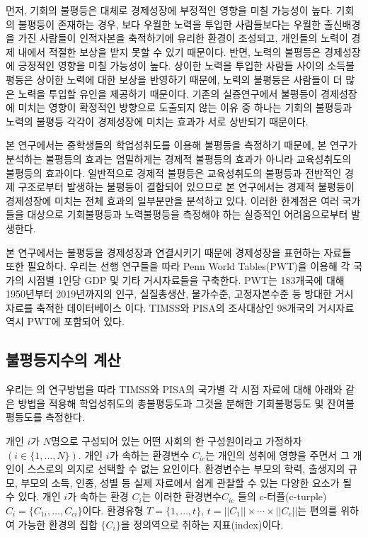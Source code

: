 먼저, 기회의 불평등은 대체로 경제성장에 부정적인 영향을 미칠 가능성이 높다.
기회의 불평등이 존재하는 경우, 보다 우월한 노력을 투입한 사람들보다는 우월한 출신배경을 가진 사람들이 인적자본을 축적하기에 유리한 환경이 조성되고, 개인들의 노력이 경제 내에서 적절한 보상을 받지 못할 수 있기 때문이다.
반면, 노력의 불평등은 경제성장에 긍정적인 영향을 미칠 가능성이 높다.
상이한 노력을 투입한 사람들 사이의 소득불평등은 상이한 노력에 대한 보상을 반영하기 때문에, 노력의 불평등은 사람들이 더 많은 노력을 투입할 유인을 제공하기 때문이다.
기존의 실증연구에서 불평등이 경제성장에 미치는 영향이 확정적인 방향으로 도출되지 않는 이유 중 하나는 기회의 불평등과 노력의 불평등 각각이 경제성장에 미치는 효과가 서로 상반되기 때문이다.

본 연구에서는 중학생들의 학업성취도를 이용해 불평등을 측정하기 때문에, 본 연구가 분석하는 불평등의 효과는 엄밀하게는 경제적 불평등의 효과가 아니라 교육성취도의 불평등의 효과이다.
일반적으로 경제적 불평등은 교육성취도의 불평등과 전반적인 경제 구조로부터 발생하는 불평등이 결합되어 있으므로 본 연구에서는 경제적 불평등이 경제성장에 미치는 전체 효과의 일부분만을 분석하고 있다.
이러한 한계점은 여러 국가들을 대상으로 기회불평등과 노력불평등을 측정해야 하는 실증적인 어려움으로부터 발생한다.

본 연구에서는 불평등을 경제성장과 연결시키기 때문에 경제성장을 표현하는 자료들 또한 필요하다.
우리는 선행 연구들을 따라 Penn World Tables(PWT)을 이용해 각 국가의 시점별 1인당 GDP 및 기타 거시자료들을 구축한다.
PWT는 183개국에 대해 1950년부터 2019년까지의 인구, 실질총생산, 물가수준, 고정자본수준 등 방대한 거시자료를 축적한 데이터베이스 이다.
TIMSS와 PISA의 조사대상인 98개국의 거시자료 역시 PWT에 포함되어 있다.

\subsection{불평등지수의 계산}
우리는 \cite{mnr13}의 연구방법을 따라 TIMSS와 PISA의 국가별 각 시점 자료에 대해 아래와 같은 방법을 적용해 학업성취도의 총불평등도과 그것을 분해한 기회불평등도 및 잔여불평등도를 측정한다. 

개인 $i$가 $N$명으로 구성되어 있는 어떤 사회의 한 구성원이라고 가정하자$(i \in \{1,\ldots,N \} )$.
개인 $i$가 속하는 환경변수 $C_{ic}$는 개인의 성취에 영향을 주면서 그 개인이 스스로의 의지로 선택할 수 없는 요인이다.
환경변수는 부모의 학력, 출생지의 규모, 부모의 소득, 인종, 성별 등 실제 자료에서 쉽게 관찰할 수 있는 다양한 요소가 될 수 있다.
개인 $i$가 속하는 환경 $C_i$는 이러한 환경변수$C_{ic}$ 들의 c-터플(c-turple) $C_i = \{C_{1i}, \ldots , C_{ci}\}$이다. 
환경유형 $T= \{1, \ldots , t \}$, $t= ||C_1|| \times \cdots \times ||C_c||$는 편의를 위하여 가능한 환경의 집합 $\{ C_i \}$을 정의역으로 취하는 지표(index)이다.

